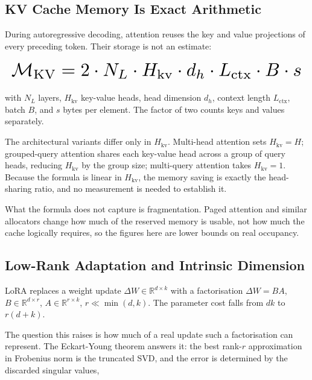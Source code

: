 \documentclass[10pt,twocolumn,letterpaper]{article}
\begin{document}
\subsection{KV Cache Memory Is Exact Arithmetic}


During autoregressive decoding, attention reuses the key and value projections of every preceding token. Their storage is not an estimate:






\begin{equation}
\resizebox{\columnwidth}{!}{$\displaystyle
\begin{aligned}
\mathcal{M}_{\text{KV}} = 2 \cdot N_L \cdot H_{\text{kv}} \cdot d_h \cdot L_{\text{ctx}} \cdot B \cdot s
\end{aligned}
$}
\end{equation}






with $N_L$ layers, $H_{\text{kv}}$ key-value heads, head dimension $d_h$, context length $L_{\text{ctx}}$, batch $B$, and $s$ bytes per element. The factor of two counts keys and values separately.

The architectural variants differ only in $H_{\text{kv}}$. Multi-head attention sets $H_{\text{kv}} = H$; grouped-query attention shares each key-value head across a group of query heads, reducing $H_{\text{kv}}$ by the group size; multi-query attention takes $H_{\text{kv}} = 1$. Because the formula is linear in $H_{\text{kv}}$, the memory saving is exactly the head-sharing ratio, and no measurement is needed to establish it.

What the formula does not capture is fragmentation. Paged attention and similar allocators change how much of the reserved memory is usable, not how much the cache logically requires, so the figures here are lower bounds on real occupancy.


\subsection{Low-Rank Adaptation and Intrinsic Dimension}


LoRA replaces a weight update $\Delta W \in \mathbb{R}^{d \times k}$ with a factorisation $\Delta W = BA$, $B \in \mathbb{R}^{d \times r}$, $A \in \mathbb{R}^{r \times k}$, $r \ll \min(d, k)$. The parameter cost falls from $dk$ to $r(d + k)$.

The question this raises is how much of a real update such a factorisation can represent. The Eckart-Young theorem answers it: the best rank-$r$ approximation in Frobenius norm is the truncated SVD, and the error is determined by the discarded singular values,
\end{document}
